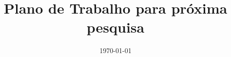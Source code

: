 \documentclass{beamer}
\title{Plano de Trabalho para próxima pesquisa}
\date{\today}
\begin{document}
\begin{frame}
  \titlepage
\end{frame}



\end{document}
